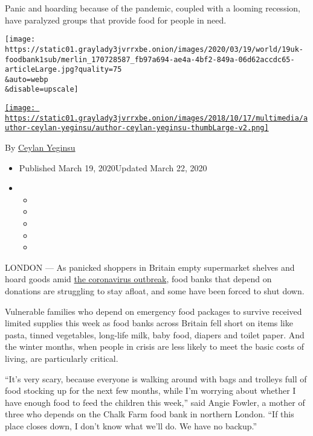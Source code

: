 Panic and hoarding because of the pandemic, coupled with a looming
recession, have paralyzed groups that provide food for people in need.

\texttt{[image: https://static01.graylady3jvrrxbe.onion/images/2020/03/19/world/19uk-foodbank1sub/merlin\_170728587\_fb97a694-ae4a-4bf2-849a-06d62accdc65-articleLarge.jpg?quality=75\\\&auto=webp\\\&disable=upscale]}

\href{https://www.nytimes3xbfgragh.onion/by/ceylan-yeginsu}{\texttt{[image: https://static01.graylady3jvrrxbe.onion/images/2018/10/17/multimedia/author-ceylan-yeginsu/author-ceylan-yeginsu-thumbLarge-v2.png]}}

By \href{https://www.nytimes3xbfgragh.onion/by/ceylan-yeginsu}{Ceylan
Yeginsu}

\begin{itemize}
\item
  Published March 19, 2020Updated March 22, 2020
\item
  \begin{itemize}
  \item
  \item
  \item
  \item
  \item
  \end{itemize}
\end{itemize}

LONDON --- As panicked shoppers in Britain empty supermarket shelves and
hoard goods amid
\href{https://www.nytimes3xbfgragh.onion/2020/03/17/world/europe/coronavirus-imperial-college-johnson.html}{the
coronavirus outbreak}, food banks that depend on donations are
struggling to stay afloat, and some have been forced to shut down.

Vulnerable families who depend on emergency food packages to survive
received limited supplies this week as food banks across Britain fell
short on items like pasta, tinned vegetables, long-life milk, baby food,
diapers and toilet paper. And the winter months, when people in crisis
are less likely to meet the basic costs of living, are particularly
critical.

``It's very scary, because everyone is walking around with bags and
trolleys full of food stocking up for the next few months, while I'm
worrying about whether I have enough food to feed the children this
week,'' said Angie Fowler, a mother of three who depends on the Chalk
Farm food bank in northern London. ``If this place closes down, I don't
know what we'll do. We have no backup.''

